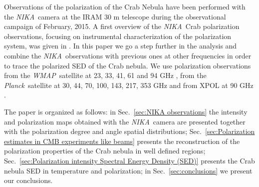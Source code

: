 \documentclass[twocolumn,traditabstract]{aa}
\def\NIKA{\textit{NIKA}}
\def\Planck{\textit{Planck}}
\def\WMAP{\textit{WMAP}}
\begin{document}
Observations of the polarization of the Crab Nebula have been performed with the
\NIKA\ camera \citep{monfardini2010,catalano2014,monfardini2014} at the IRAM 30
m telescope during the observational campaign of February, 2015. A first
overview of the \NIKA\ Crab polarization observations, focusing on instrumental characterization of the polarization system, was given in
\cite{2016JLTP..184..724R}. In this paper we go a step further in the analysis
and combine the \NIKA\ observations with previous ones at other frequencies in order to trace the
polarized SED of the Crab nebula. We use polarization observations from the \WMAP\
satellite at 23, 33, 41, 61 and 94 GHz \citep{2011ApJS..192...19W}, from the
\Planck\ satellite at 30, 44, 70, 100, 143, 217, 353 GHz and from XPOL at 90 GHz
\citep{aumont2010}. 

The paper is organized as follows: in Sec.~\ref{sec:NIKA observations} the
intensity and polarization maps obtained with the \NIKA\ camera are presented
together with the polarization degree and angle spatial distributions;
Sec.~\ref{sec:Polarization estimates in CMB experiments like beams} presents the
reconstruction of the polarization properties of the Crab nebula in well defined
regions; Sec.~\ref{sec:Polarization intensity Spectral Energy Density (SED)}
presents the Crab nebula SED in temperature and polarization; in
Sec.~\ref{sec:conclusions} we present our conclusions.
\end{document}
